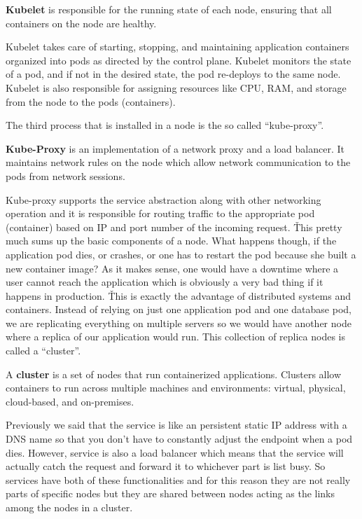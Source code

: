 \bd[Kubelet]
\textbf{Kubelet} is responsible for the running state of each node, ensuring that all containers on the node are
healthy.
\ed

Kubelet takes care of starting, stopping, and maintaining application containers organized into pods as directed by
the control plane. Kubelet monitors the state of a pod, and if not in the desired state, the pod re-deploys to the
same node. Kubelet is also responsible for assigning resources like CPU, RAM, and storage from the node to the pods
(containers).


The third process that is installed in a node is the so called ``kube-proxy''.

\textbf{Kube-Proxy} is an implementation of a network proxy and a load balancer. It maintains network rules on the
node which allow network communication to the pods from network sessions.
\ed


Kube-proxy supports the service abstraction along with other networking operation and it is responsible for routing
traffic to the appropriate pod (container) based on IP and port number of the incoming request. \v

This pretty much sums up the basic components of a node. What happens though, if the application pod dies, or
crashes, or one has to restart the pod because she built a new container image? As it makes sense, one would have a
downtime where a user cannot reach the application which is obviously a very bad thing if it happens in production. \v

This is exactly the advantage of distributed systems and containers. Instead of relying on just one application pod
and one database pod, we are replicating everything on multiple servers so we would have another node where a replica
of our application would run. This collection of replica nodes is called a ``cluster''.

\bd[Cluster]
A \textbf{cluster} is a set of nodes that run containerized applications. Clusters allow containers to run across
multiple machines and environments: virtual, physical, cloud-based, and on-premises.
\ed

Previously we said that the service is like an persistent static IP address with a DNS name so that you don't have to
constantly adjust the endpoint when a pod dies. However, service is also a load balancer which means that the service
will actually catch the request and forward it to whichever part is list busy. So services have both of these
functionalities and for this reason they are not really parts of specific nodes but they are shared between nodes
acting as the links among the nodes in a cluster.

